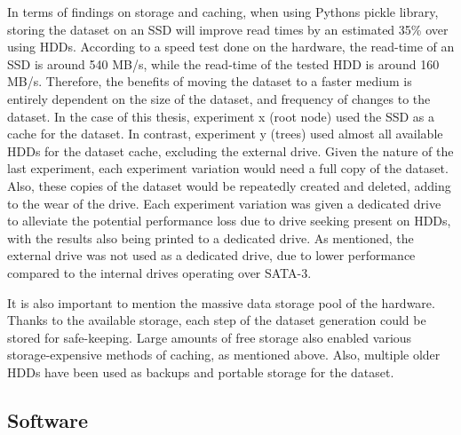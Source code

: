In terms of findings on storage and caching, when using Pythons pickle library, storing the dataset on an SSD will improve read times by an estimated 35\% over using HDDs.
According to a speed test done on the hardware, the read-time of an SSD is around 540 MB/s, while the read-time of the tested HDD is around 160 MB/s.
Therefore, the benefits of moving the dataset to a faster medium is entirely dependent on the size of the dataset, and frequency of changes to the dataset.
In the case of this thesis, experiment x (root node) used the SSD as a cache for the dataset.%
In contrast, experiment y (trees) used almost all available HDDs for the dataset cache, excluding the external drive.%
Given the nature of the last experiment, each experiment variation would need a full copy of the dataset.
Also, these copies of the dataset would be repeatedly created and deleted, adding to the wear of the drive.
Each experiment variation was given a dedicated drive to alleviate the potential performance loss due to drive seeking present on HDDs, with the results also being printed to a dedicated drive.
As mentioned, the external drive was not used as a dedicated drive, due to lower performance compared to the internal drives operating over SATA-3.

It is also important to mention the massive data storage pool of the hardware.
Thanks to the available storage, each step of the dataset generation could be stored for safe-keeping.
Large amounts of free storage also enabled various storage-expensive methods of caching, as mentioned above.
Also, multiple older HDDs have been used as backups and portable storage for the dataset.

\subsection{Software}






